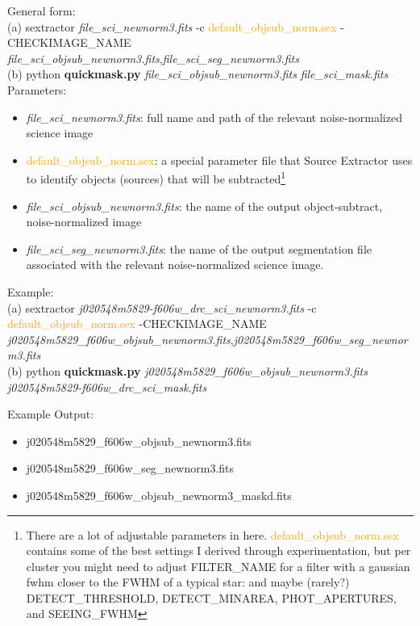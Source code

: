 \documentclass[a4paper,10pt]{article}
\begin{document}
General form: \\
(a) sextractor \textit{file\_sci\_newnorm3.fits} -c \textcolor{orange}{default\_objsub\_norm.sex} -CHECKIMAGE\_NAME \textit{file\_sci\_objsub\_newnorm3.fits},\textit{file\_sci\_seg\_newnorm3.fits}  \\

\noindent (b) python \textbf{quickmask.py} \textit{file\_sci\_objsub\_newnorm3.fits} \textit{file\_sci\_mask.fits} \\


\noindent Parameters:
\begin{itemize}
    \setlength{\itemsep}{-5pt}
    \item \textit{file\_sci\_newnorm3.fits}: full name and path of the relevant noise-normalized science image
    \item \textcolor{orange}{default\_objsub\_norm.sex}: a special parameter file that Source Extractor uses to identify objects (sources) that will be subtracted\footnote{There are a lot of adjustable parameters in here. \textcolor{orange}{default\_objsub\_norm.sex} contains some of the best settings I derived through experimentation, but per cluster you might need to adjust FILTER\_NAME for a filter with a gaussian fwhm closer to the FWHM of a typical star: and maybe (rarely?) DETECT\_THRESHOLD, DETECT\_MINAREA, PHOT\_APERTURES, and SEEING\_FWHM}
    \item \textit{file\_sci\_objsub\_newnorm3.fits}: the name of the output object-subtract, noise-normalized image
    \item \textit{file\_sci\_seg\_newnorm3.fits}: the name of the output segmentation file associated with the relevant noise-normalized science image.
\end{itemize}


\noindent Example:\\
(a) sextractor \textit{j020548m5829-f606w\_drc\_sci\_newnorm3.fits} -c \textcolor{orange}{default\_objsub\_norm.sex} -CHECKIMAGE\_NAME \textit{j020548m5829\_f606w\_objsub\_newnorm3.fits},\textit{j020548m5829\_f606w\_seg\_newnorm3.fits}  \\

\noindent (b) python \textbf{quickmask.py} \textit{j020548m5829\_f606w\_objsub\_newnorm3.fits} \textit{j020548m5829-f606w\_drc\_sci\_mask.fits}


\noindent Example Output:
\begin{itemize}
    \setlength{\itemsep}{-5pt}
 \item j020548m5829\_f606w\_objsub\_newnorm3.fits
 \item j020548m5829\_f606w\_seg\_newnorm3.fits
 \item j020548m5829\_f606w\_objsub\_newnorm3\_maskd.fits
\end{itemize}
\end{document}
